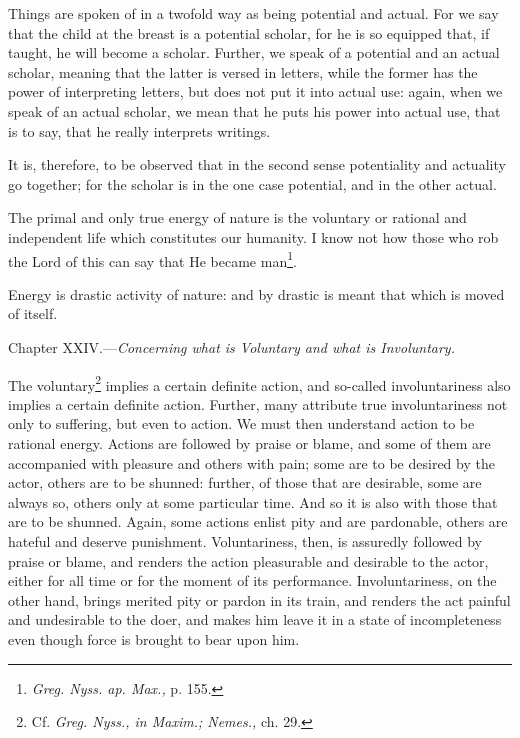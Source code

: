 Things are spoken of in a twofold way as being potential and actual. For we say that the child at the breast is a potential scholar, for he is so equipped that, if taught, he will become a scholar. Further, we speak of a potential and an actual scholar, meaning that the latter is versed in letters, while the former has the power of interpreting letters, but does not put it into actual use: again, when we speak of an actual scholar, we mean that he puts his power into actual use, that is to say, that he really interprets writings.

It is, therefore, to be observed that in the second sense potentiality and actuality go together; for the scholar is in the one case potential, and in the other actual.

The primal and only true energy of nature is the voluntary or rational and independent life which constitutes our humanity. I know not how those who rob the Lord of this can say that He became man\footnote{\emph{Greg. Nyss. ap. Max., }p. 155.}.

Energy is drastic activity of nature: and by drastic is meant that which is moved of itself.


Chapter XXIV.—\emph{Concerning what is Voluntary and what is Involuntary.}

The voluntary\footnote{Cf. \emph{Greg. Nyss., in Maxim.; Nemes., }ch. 29.} implies a certain definite action, and so-called involuntariness also implies a certain definite action. Further, many attribute true involuntariness not only to suffering, but even to action. We must then understand action to be rational energy. Actions are followed by praise or blame, and some of them are accompanied with pleasure and others with pain; some are to be desired by the actor, others are to be shunned: further, of those that are desirable, some are always so, others only at some particular time. And so it is also with those that are to be shunned. Again, some actions enlist pity and are pardonable, others are hateful and deserve punishment. Voluntariness, then, is assuredly followed by praise or blame, and renders the action pleasurable and desirable to the actor, either for all time or for the moment of its performance. Involuntariness, on the other hand, brings merited pity or pardon in its train, and renders the act painful and undesirable to the doer, and makes him leave it in a state of incompleteness even though force is brought to bear upon him.

